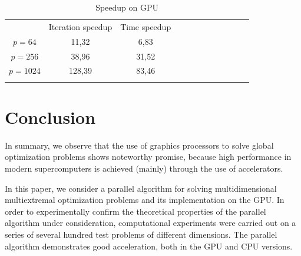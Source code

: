 \documentclass{svproc}
\begin{document}
\begin{table}
                \caption{Speedup on GPU}
                \label{table:average_MMAS_GPU}
                \center
                \begin{tabular}{cccccccccccc}
                &  Iteration speedup &   Time speedup\\

                               \noalign{\smallskip} \hline \noalign{\smallskip}                               
                               $p=64$  &    11,32	 & 6,83	  \\
                               $p=256$ &    38,96	 & 31,52  \\
							   $p=1024$&    128,39	 & 83,46  \\
                               \noalign{\smallskip}\hline
                \end{tabular}
\end{table}


\section{Conclusion}

In summary, we observe that the use of graphics processors to solve global optimization problems shows noteworthy promise, because high performance in modern supercomputers is achieved (mainly) through the use of accelerators.

In this paper, we consider a parallel algorithm for solving multidimensional multiextremal optimization problems and its implementation on the GPU. In order to experimentally confirm the theoretical properties of the parallel algorithm under consideration, computational experiments were carried out on a series of several hundred test problems of different dimensions. The parallel algorithm demonstrates good acceleration, both in the GPU and CPU versions.


%
%

{}
\end{document}
